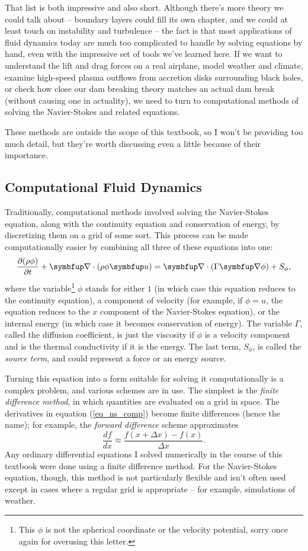 That list is both impressive and also short.  Although there's more theory we could talk about -- boundary layers could fill its own chapter, and we could at least touch on instability and turbulence -- the fact is that most applications of fluid dynamics today are much too complicated to handle by solving equations by hand, even with the impressive set of tools we've learned here.  If we want to understand the lift and drag forces on a real airplane, model weather and climate, examine high-speed plasma outflows from accretion disks surrounding black holes, or check how close our dam breaking theory matches an actual dam break (without causing one in actuality), we need to turn to computational methods of solving the Navier-Stokes and related equations. 

These methods are outside the scope of this textbook, so I won't be providing too much detail, but they're worth discussing even a little because of their importance.  

\subsection{Computational Fluid Dynamics}

Traditionally, computational methods involved solving the Navier-Stokes equation, along with the continuity equation and conservation of energy, by discretizing them on a grid of some sort.  This process can be made computationally easier by combining all three of these equations into one:
\begin{equation}
\label{eq_ns_comp}
\dfdx{(\rho \phi)}{t} + \grad \cdot (\rho \phi \vec{u}) = \grad \cdot (\Gamma \grad \phi) + S_\phi,
\end{equation}
where the variable\footnote{This $\phi$ is not the spherical coordinate or the velocity potential, sorry once again for overusing this letter.} $\phi$ stands for either $1$ (in which case this equation reduces to the continuity equation), a component of velocity (for example, if $\phi = u$, the equation reduces to the $x$ component of the Navier-Stokes equation), or the internal energy (in which case it becomes conservation of energy).  The variable $\Gamma$, called the diffusion coefficient, is just the viscosity if $\phi$ is a velocity component and is the thermal conductivity if it is the energy.  The last term, $S_\phi$, is called the \emph{source term}, and could represent a force or an energy source.

Turning this equation into a form suitable for solving it computationally is a complex problem, and various schemes are in use.  The simplest is the \emph{finite difference method}, in which quantities are evaluated on a grid in space.  The derivatives in equation (\ref{eq_ns_comp}) become finite differences (hence the name); for example, the \emph{forward difference} scheme approximates
\[
\frac{df}{dx} \approx \frac{f(x+\Delta x) - f(x)}{\Delta x}.
\]
Any ordinary differential equations I solved numerically in the course of this textbook were done using a finite difference method.  For the Navier-Stokes equation, though, this method is not particularly flexible and isn't often used except in cases where a regular grid is appropriate -- for example, simulations of weather.

